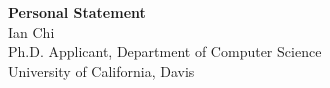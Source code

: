 \documentclass[11pt]{article}
\begin{document}
\begin{center}
    {\Large \textbf{Personal Statement}}\\[4pt]
    {\large Ian Chi}\\[2pt]
    Ph.D. Applicant, Department of Computer Science\\
    University of California, Davis
\end{center}

\vspace{1em}

\end{document}
